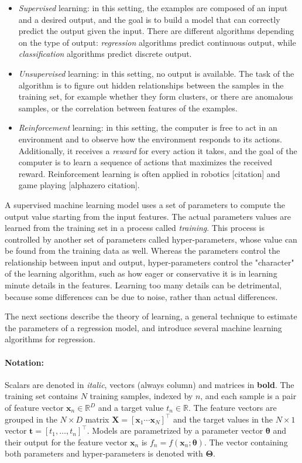 \documentclass[a4paper]{book}
\begin{document}
\begin{itemize}
\item \emph{Supervised} learning: in this setting, the examples are composed of an input and a desired output, and the goal is to build a model that can correctly predict the output given the input. There are different algorithms depending on the type of output: \emph{regression} algorithms predict continuous output, while \emph{classification} algorithms predict discrete output.

\item \emph{Unsupervised} learning: in this setting, no output is available. The task of the algorithm is to figure out hidden relationships between the samples in the training set, for example whether they form clusters, or there are anomalous samples, or the correlation between features of the examples.

\item \emph{Reinforcement} learning: in this setting, the computer is free to act in an environment and to observe how the environment responds to its actions. Additionally, it receives a \emph{reward} for every action it takes, and the goal of the computer is to learn a sequence of actions that maximizes the received reward. Reinforcement learning is often applied in robotics [citation] and game playing [alphazero citation].
\end{itemize}

A supervised machine learning model uses a set of parameters to compute the output value starting from the input features. The actual parameters values are learned from the training set in a process called \emph{training}. This process is controlled by another set of parameters called hyper-parameters, whose value can be found from the training data as well. Whereas the parameters control the relationship between input and output, hyper-parameters control the "character" of the learning algorithm, such as how eager or conservative it is in learning minute details in the features. Learning too many details can be detrimental, because some differences can be due to noise, rather than actual differences.

The next sections describe the theory of learning, a general technique to estimate the parameters of a regression model, and introduce several machine learning algorithms for regression.

\paragraph{Notation:} Scalars are denoted in \textit{italic}, vectors (always column) and matrices in \textbf{bold}. The training set contains $N$ training samples, indexed by $n$, and each sample is a pair of feature vector $\bm x_n\in\mathbb{R}^D$ and a target value $t_n\in\mathbb{R}$. The feature vectors are grouped in the $N\times D$ matrix $\bm X=\left[\bm x_1\dotsb\bm x_N\right]^\intercal$ and the target values in the $N\times 1$ vector $\bm t=\left[t_1,\ldots,t_n\right]^\intercal$. Models are parametrized by a parameter vector $\bm\theta$ and their output for the feature vector $\bm x_n$ is $f_n=f(\bm x_n;\bm\theta)$. The vector containing both parameters and hyper-parameters is denoted with $\bm\Theta$.
\end{document}
